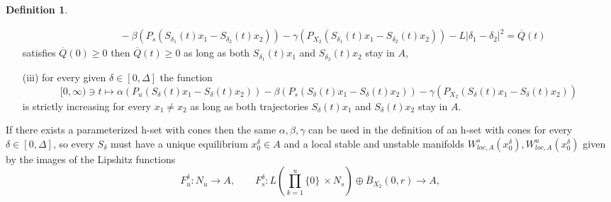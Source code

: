 \documentclass[11pt, leqno]{amsart}
\theoremstyle{definition}
\newtheorem{df}[thm]{Definition}
\begin{document}
\begin{df}
\begin{itemize}
\begin{align*}
			& \qquad - \beta(P_{s} (S_{\delta_1}(t)x_1-S_{\delta_2}(t)x_2)) - \gamma(P_{X_2} (S_{\delta_1}(t)x_1-S_{\delta_2}(t)x_2)) - L|\delta_1-\delta_2|^2  = \overline{Q}(t)
		\end{align*}
		satisfies $\overline{Q}(0) \geq 0$ then $\overline{Q}(t) \geq 0$ as long as both $S_{\delta_1}(t)x_1$ and $S_{\delta_2}(t)x_2$ stay in $A$,
		\item[(iii)] for every given $\delta\in [0,\Delta]$ the function
		$$
		[0,\infty) \ni t\mapsto \alpha(P_u (S_{\delta}(t)x_1-S_{\delta}(t)x_2)) - \beta(P_{s} (S_{\delta}(t)x_1-S_{\delta}(t)x_2)) - \gamma(P_{X_2} (S_{\delta}(t)x_1-S_{\delta}(t)x_2))
		$$
		is strictly increasing for every $x_1\neq x_2$ as long as both trajectories $S_\delta(t)x_1$ and $S_\delta(t)x_2$ stay in $A$.
	\end{itemize}
	If there exists a parameterized h-set with cones then the same $\alpha, \beta, \gamma$ can be used in the definition of an h-set with cones for every $\delta\in [0,\Delta]$, so every $S_\delta$ must have a unique equilibrium $x_0^\delta\in A$ and a local stable and unstable manifolds $W^s_{loc,A}(x_0^\delta), W^u_{loc,A}(x_0^\delta)$ given by the images of the Lipshitz functions
	$$
	F_u^\delta:N_u \to A, \qquad F_s^\delta :L \left( \prod_{k=1}^{u} \{ 0 \}\ \times N_s \right) \oplus \overline{B}_{X_2}(0,r) \to A,
	$$
\end{df}
\end{document}
